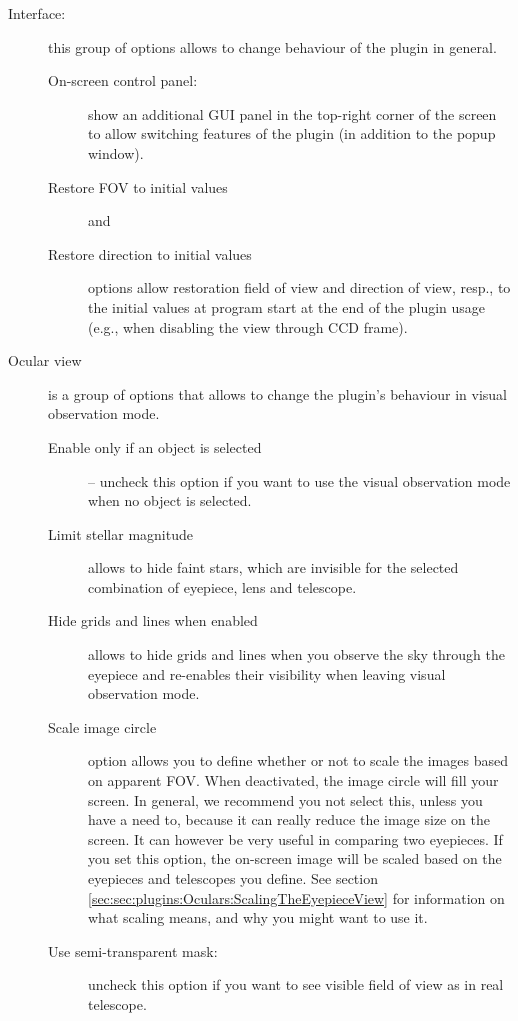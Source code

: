 \begin{description}
\item[Interface:] this group of options allows to change behaviour of the plugin in general.
 \begin{description}
   \item[On-screen control panel:] show an additional GUI panel in the top-right corner of the screen to allow switching features of the plugin (in addition to the popup window).
   \item[Restore FOV to initial values] and
   \item[Restore direction to initial values] options allow restoration field of view and direction of view, resp., 
         to the initial values at program start at the end of the plugin usage (e.g., when disabling the view through CCD frame).
 \end{description}
\item[Ocular view] is a group of options that allows to change the plugin's behaviour in visual observation mode.
 \begin{description}
   \item[Enable only if an object is selected] -- uncheck this option if you want to use the visual observation mode when no object is selected.
   \item[Limit stellar magnitude] allows to hide faint stars, which are invisible for the selected combination of eyepiece, lens and telescope.
   \item[Hide grids and lines when enabled] allows to hide grids and lines when you observe the sky through the eyepiece and re-enables their visibility when leaving visual observation mode.
   \item[Scale image circle] option allows you to define whether or not to scale the images based on apparent FOV. When deactivated, the image circle will fill your screen. 
         In general, we recommend you not select this, unless you have a need to, because it can really reduce the image size on the screen. 
		 It can however be very useful in comparing two eyepieces. 
		 If you set this option, the  on-screen image will be scaled based on the eyepieces and telescopes you define. 
		 See section \ref{sec:sec:plugins:Oculars:ScalingTheEyepieceView} for information on what scaling means, and why you might want to use it.
   \item[Use semi-transparent mask:] uncheck this option if you want to see visible field of view as in real telescope.
 \end{description}

\end{description}
